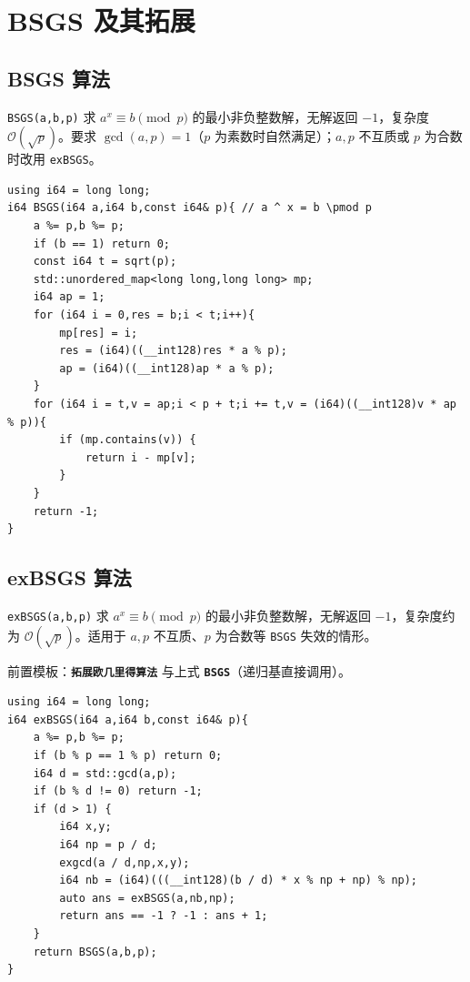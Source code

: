 \section{BSGS 及其拓展}

\subsection{BSGS 算法}

\verb|BSGS(a,b,p)| 求 $a^x\equiv b\pmod{p}$ 的最小非负整数解，无解返回 $-1$，复杂度 $\mathcal{O}(\sqrt{p})$。要求 $\gcd(a,p)=1$（$p$ 为素数时自然满足）；$a,p$ 不互质或 $p$ 为合数时改用 \verb|exBSGS|。

\begin{lstlisting}
using i64 = long long;
i64 BSGS(i64 a,i64 b,const i64& p){ // a ^ x = b \pmod p
    a %= p,b %= p;
    if (b == 1) return 0;
    const i64 t = sqrt(p);
    std::unordered_map<long long,long long> mp;
    i64 ap = 1;
    for (i64 i = 0,res = b;i < t;i++){
        mp[res] = i;
        res = (i64)((__int128)res * a % p);
        ap = (i64)((__int128)ap * a % p);
    }
    for (i64 i = t,v = ap;i < p + t;i += t,v = (i64)((__int128)v * ap % p)){
        if (mp.contains(v)) {
            return i - mp[v];
        }
    }
    return -1;
}
\end{lstlisting}

\subsection{exBSGS 算法}

\verb|exBSGS(a,b,p)| 求 $a^x\equiv b\pmod{p}$ 的最小非负整数解，无解返回 $-1$，复杂度约为 $\mathcal{O}(\sqrt p)$。适用于 $a,p$ 不互质、$p$ 为合数等 \verb|BSGS| 失效的情形。

前置模板：\textbf{\texttt{拓展欧几里得算法}} 与上式 \textbf{\texttt{BSGS}}（递归基直接调用）。

\begin{lstlisting}
using i64 = long long;
i64 exBSGS(i64 a,i64 b,const i64& p){
    a %= p,b %= p;
    if (b % p == 1 % p) return 0;
    i64 d = std::gcd(a,p);
    if (b % d != 0) return -1;
    if (d > 1) {
        i64 x,y;
        i64 np = p / d;
        exgcd(a / d,np,x,y);
        i64 nb = (i64)(((__int128)(b / d) * x % np + np) % np);
        auto ans = exBSGS(a,nb,np);
        return ans == -1 ? -1 : ans + 1;
    }
    return BSGS(a,b,p);
}
\end{lstlisting}